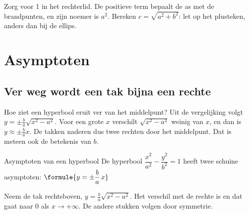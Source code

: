 
\begin{werkwijze}
Zorg voor 1 in het rechterlid. De positieve term bepaalt de as met de brandpunten, en zijn noemer is $a^2$. Bereken $c = \sqrt{a^2 + b^2}$: let op het plusteken, anders dan bij de ellips.
\end{werkwijze}


\begin{oefeningen}

\end{oefeningen}

\section{Asymptoten}

\subsection{Ver weg wordt een tak bijna een rechte}

Hoe ziet een hyperbool eruit ver van het middelpunt? Uit de vergelijking volgt $y = \pm\tfrac ba\sqrt{x^2 - a^2}$. Voor een grote $x$ verschilt $\sqrt{x^2 - a^2}$ weinig van $x$, en dan is $y \approx \pm\tfrac ba x$. De takken naderen dus twee rechten door het middelpunt. Dat is meteen ook de betekenis van $b$.

\begin{theorie}
\begin{stelling}{Asymptoten van een hyperbool}
De hyperbool $\dfrac{x^2}{a^2} - \dfrac{y^2}{b^2} = 1$ heeft twee schuine asymptoten: \qquad $\formule{y = \pm\dfrac ba\, x}$
\end{stelling}

\begin{bewijs}
Neem de tak rechtsboven, $y = \tfrac ba\sqrt{x^2 - a^2}$. Het verschil met de rechte is
en dat gaat naar 0 als $x \to +\infty$. De andere stukken volgen door symmetrie.
\end{bewijs}
\end{theorie}

